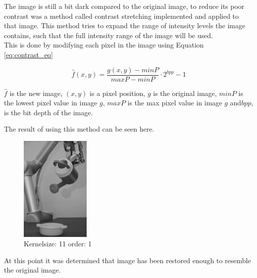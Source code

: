 The image is still a bit dark compared to the original image, to reduce its poor contrast was a method called contrast stretching implemented and applied to that image.  This method tries to expand the range of intensity levels the image contains, such that the full intensity range of the image will be used. 
\\

This is done by modifying each pixel in the image using Equation \ref{eq:contrast_eq}

\begin{equation}
\hat{f}(x,y) = \frac{g(x,y) - minP}{maxP - minP} \cdot 2^{bpp }-1
\label{eq:contrast_eq}
\end{equation}
  
$\hat{f}$ is the new image,  $(x,y)$ is  a pixel position, $g$ is the original image, $minP$ is the lowest pixel value in image $g$, $maxP$ is the max pixel value in image $g$ and$ bpp$, is the bit depth of the image. 

The result of using this method can be seen here. 

\begin{figure}[H]
\centering
 \includegraphics[width=0.30\textwidth]{img1/img_1_gaus_5_1_constrast_strech.png}
        \caption{Kernelsize: 11 order: 1}
         \label{fig:img1_contra11_1}
\end{figure}

At this point it was determined that image has been restored enough to resemble the original image. 

